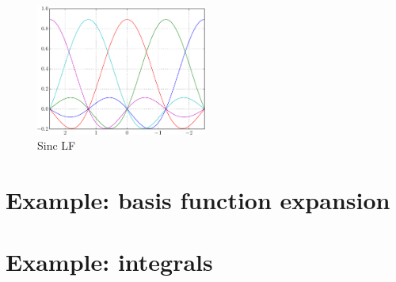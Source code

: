 \begin{figure}[h]
{\centering
\includegraphics[width=0.5\textwidth]{../../tests/plot_1d/LF1d_sinc.pdf}
\par}
\caption{Sinc LF}\label{fig:LF1d_sinc_5}
\end{figure}


\section{Example: basis function expansion}


\section{Example: integrals}
